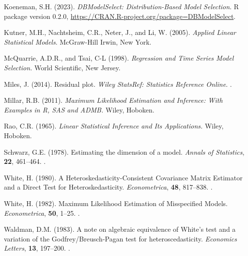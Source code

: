 \documentclass[sn-mathphys-ay]{sn-jnl}
\begin{document}
\begin{thebibliography}{99}
{\rm Koeneman, S.H.} (2023).
\newblock \emph{DBModelSelect: Distribution-Based Model Selection}.
\newblock R package version 0.2.0, \url{https://CRAN.R-project.org/package=DBModelSelect}.

{\rm Kutner, M.H., Nachtsheim, C.R., Neter, J., and Li, W.} (2005).
 \emph{Applied Linear Statistical Models}.
\newblock McGraw-Hill Irwin, New York.

{\rm McQuarrie, A.D.R., and Tsai, C-L} (1998).
 \emph{Regression and Time Series Model Selection.}
\newblock World Scientific, New Jersey.

{\rm Miles, J.} (2014).
\newblock Residual plot.
\newblock \emph{Wiley StatsRef: Statistics Reference Online}.
\newblock {}.

{\rm Millar, R.B.} (2011).
\newblock \emph{Maximum Likelihood Estimation and Inference: With Examples in R, SAS and ADMB.}
\newblock Wiley, Hoboken.

{\rm Rao, C.R.} (1965).
\newblock \emph{Linear Statistical Inference and Its Applications.}
\newblock Wiley, Hoboken.

{\rm Schwarz, G.E.} (1978).
\newblock Estimating the dimension of a model.
\newblock \emph{Annals of Statistics}, {\bf 22},  461--464.
\newblock {}.

{\rm White, H.} (1980).
\newblock A Heteroskedasticity-Consistent Covariance Matrix Estimator and a Direct Test for Heteroskedasticity.
\newblock \emph{Econometrica}, {\bf 48},  817--838.
\newblock {}.

{\rm White, H.} (1982).
\newblock Maximum Likelihood Estimation of Misspecified Models.
\newblock \emph{Econometrica}, {\bf 50},  1--25.
\newblock {}.

{\rm Waldman, D.M.} (1983).
\newblock A note on algebraic equivalence of White's test and a variation of the Godfrey/Breusch-Pagan test for heteroscedasticity.
\newblock \emph{Economics Letters}, {\bf 13},  197--200.
\newblock {}.

\end{thebibliography}

\end{document}
